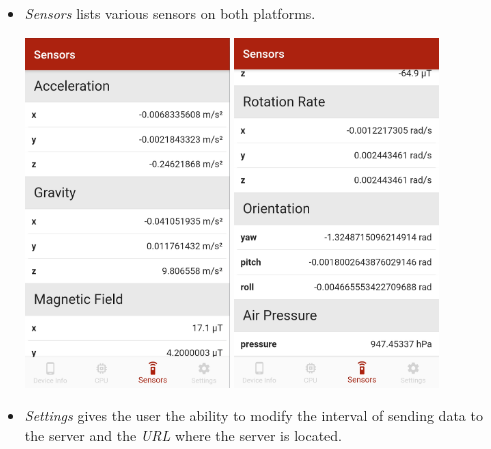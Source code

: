 \documentclass{article}
\begin{document}
\begin{itemize}
    \item \textit{Sensors} lists various sensors on both platforms.

    \begin{center}
      \includegraphics[height=25em]{mobile-sensors}
      \includegraphics[height=25em]{mobile-sensors-2}
    \end{center}

    \item \textit{Settings} gives the user the ability to modify the interval of sending data to the server and the \textit{URL} where the server is located.


\end{itemize}
\end{document}

